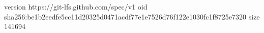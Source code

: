 version https://git-lfs.github.com/spec/v1
oid sha256:be1b2eedfe5cc11d20325d0471acdf77e1e7526d76f122e1030fc1f8725e7320
size 141694
